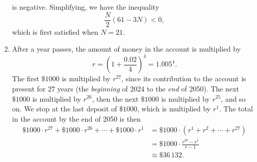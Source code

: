 \begin{enumerate}
\begin{equation*}
\end{equation*}
is negative. Simplifying, we have the inequality
\begin{equation*}
\frac{N}{2}(61 - 3N) < 0,
\end{equation*}
which is first satisfied when $N = \boxed{21}$.
\item After a year passes, the amount of money in the account is multiplied by
\begin{equation*}
r = \left(1 + \frac{0.02}{4}\right)^4 = 1.005^4.
\end{equation*}
The first $\$1000$ is multiplied by $r^{27}$, since its contribution to the account is present for $27$ years (the \emph{beginning} of 2024 to the \emph{end} of 2050). The next $\$1000$ is multiplied by $r^{26}$, then the next $\$1000$ is multiplied by $r^{25}$, and so on. We stop at the last deposit of $\$1000$, which is multiplied by $r^1$. The total in the account by the end of 2050 is then 
\begin{align*} 
\$1000\cdot r^{27} + \$1000\cdot r^{26} + \cdots + \$1000\cdot r^1 &= \$1000\cdot (r^1 + r^2 + \cdots + r^{27}) \\
&= \$1000\cdot\frac{r^{28} - r^1}{r - 1} \\
&\approx \$36\,132.
\end{align*} 
\end{enumerate}